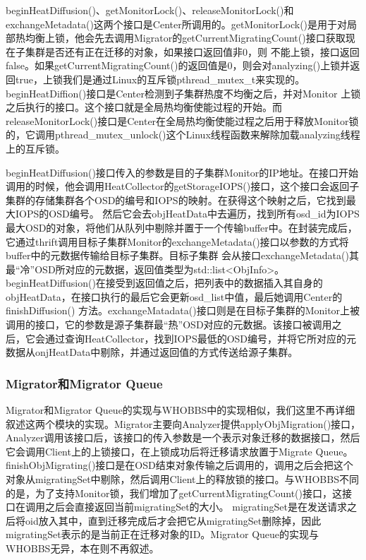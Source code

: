 beginHeatDiffusion()、getMonitorLock()、releaseMonitorLock()和exchangeMetadata()这两个接口是Center所调用的。getMonitorLock()是用于对局部热均衡上锁，他会先去调用Migrator的getCurrentMigratingCount()接口获取现在子集群是否还有正在迁移的对象，如果接口返回值非0，则
不能上锁，接口返回false。如果getCurrentMigratingCount()的返回值是0，则会对analyzing()上锁并返回true，上锁我们是通过Linux的互斥锁pthread\_mutex\_t来实现的。beginHeatDiffion()接口是Center检测到子集群热度不均衡之后，并对Monitor
上锁之后执行的接口。这个接口就是全局热均衡使能过程的开始。而releaseMonitorLock()接口是Center在全局热均衡使能过程之后用于释放Monitor锁的，它调用pthread\_mutex\_unlock()这个Linux线程函数来解除加载analyzing线程上的互斥锁。

beginHeatDiffusion()接口传入的参数是目的子集群Monitor的IP地址。在接口开始调用的时候，他会调用HeatCollector的getStorageIOPS()接口，这个接口会返回子集群的存储集群各个OSD的编号和IOPS的映射。在获得这个映射之后，它找到最大IOPS的OSD编号。
然后它会去objHeatData中去遍历，找到所有osd\_id为IOPS最大OSD的对象，将他们从队列中剔除并置于一个传输buffer中。在封装完成后，它通过thrift调用目标子集群Monitor的exchangeMetadata()接口以参数的方式将buffer中的元数据传输给目标子集群。目标子集群
会从接口exchangeMetadata()其最“冷”OSD所对应的元数据，返回值类型为std::list<ObjInfo>。beginHeatDiffusion()在接受到返回值之后，把列表中的数据插入其自身的objHeatData，在接口执行的最后它会更新osd\_list中值，最后她调用Center的finishDiffusion()
方法。exchangeMatadata()接口则是在目标子集群的Monitor上被调用的接口，它的参数是源子集群最“热”OSD对应的元数据。该接口被调用之后，它会通过查询HeatCollector，找到IOPS最低的OSD编号，并将它所对应的元数据从onjHeatData中剔除，并通过返回值的方式传送给源子集群。

\subsubsection{Migrator和Migrator Queue}
Migrator和Migrator Queue的实现与WHOBBS中的实现相似，我们这里不再详细叙述这两个模块的实现。Migrator主要向Analyzer提供applyObjMigration()接口，Analyzer调用该接口后，该接口的传入参数是一个表示对象迁移的数据接口，然后它会调用Client上的上锁接口，在上锁成功后将迁移请求放置于Migrate Queue。
finishObjMigrating()接口是在OSD结束对象传输之后调用的，调用之后会把这个对象从migratingSet中剔除，然后调用Client上的释放锁的接口\cite{lingxuan2015whobbs}。与WHOBBS不同的是，为了支持Monitor锁，我们增加了getCurrentMigratingCount()接口，这接口在调用之后会直接返回当前migratingSet的大小。
migratingSet是在发送请求之后将oid放入其中，直到迁移完成后才会把它从migratingSet删除掉，因此migratingSet表示的是当前正在迁移对象的ID。Migrator Queue的实现与WHOBBS无异，本在则不再叙述。

